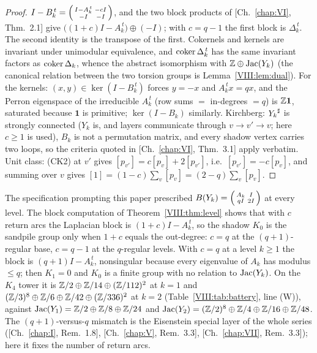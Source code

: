 \begin{proof}
$I-B_k^{\,t}=\begin{psmallmatrix}I-A_k^{\,t}&-cI\\-I&-I\end{psmallmatrix}$, and the two
block products of [Ch.~\ref{chap:VI}, Thm.~2.1] give $\bigl((1+c)I-A_k^{\,t}\bigr)\oplus(-I)$; with
$c=q-1$ the first block is $\Delta_k^{\,t}$. The second identity is the transpose of
the first. Cokernels and kernels are invariant under unimodular equivalence, and
$\operatorname{coker}\Delta_k^{\,t}$ has the same invariant factors as $\operatorname{coker}\Delta_k$, whence the
abstract isomorphism with $\mathbb{Z}\oplus\operatorname{Jac}(Y_k)$ (the canonical relation between the two
torsion groups is Lemma~\ref{VIII:lem:dual}). For the kernels: $(x,y)\in\ker(I-B_k^{\,t})$
forces $y=-x$ and $A_k^{\,t}x=qx$, and the Perron eigenspace of the irreducible
$A_k^{\,t}$ (row sums $=$ in-degrees $=q$) is $\mathbb{Z}\mathbf1$, saturated because $\mathbf1$
is primitive; $\ker(I-B_k)$ similarly. Kirchberg: ${Y_k}^{\sharp}$ is strongly connected
($Y_k$ is, and layers communicate through $v\to v'\to v$; here $c\ge1$ is used), $B_k$
is not a permutation matrix, and every shadow vertex carries two loops, so the criteria
quoted in [Ch.~\ref{chap:VI}, Thm.~3.1] apply verbatim. Unit class: (CK2) at $v'$ gives
$[p_{v'}]=c[p_v]+2[p_{v'}]$, i.e.\ $[p_{v'}]=-c[p_v]$, and summing over $v$ gives
$[1]=(1-c)\sum_v[p_v]=(2-q)\sum_v[p_v]$.
\end{proof}

\begin{remark}\label{VIII:rem:cq}
The specification prompting this paper prescribed $B(Y_k)=\begin{psmallmatrix}A_k&I\\
qI&2I\end{psmallmatrix}$ at every level. The block computation of
Theorem~\ref{VIII:thm:level} shows that with $c$ return arcs the Laplacian block is
$(1+c)I-A_k^{\,t}$, so the shadow $K_0$ is the sandpile group only when $1+c$ equals the
out-degree: $c=q$ at the $(q{+}1)$-regular base, $c=q-1$ at the $q$-regular levels.
With $c=q$ at a level $k\ge1$ the block is $(q{+}1)I-A_k^{\,t}$, nonsingular because
every eigenvalue of $A_k$ has modulus $\le q$; then $K_1=0$ and $K_0$ is a finite group
with no relation to $\operatorname{Jac}(Y_k)$. On the $K_4$ tower it is $\mathbb{Z}/2\oplus\mathbb{Z}/14\oplus(\mathbb{Z}/112)^2$
at $k=1$ and $(\mathbb{Z}/3)^8\oplus\mathbb{Z}/6\oplus\mathbb{Z}/42\oplus(\mathbb{Z}/336)^2$ at $k=2$
(Table~\ref{VIII:tab:battery}, line (W)), against $\operatorname{Jac}(Y_1)=\mathbb{Z}/2\oplus\mathbb{Z}/8\oplus\mathbb{Z}/24$ and
$\operatorname{Jac}(Y_2)=(\mathbb{Z}/2)^8\oplus\mathbb{Z}/4\oplus\mathbb{Z}/16\oplus\mathbb{Z}/48$. The $(q{+}1)$-versus-$q$ mismatch
is the Eisenstein special layer of the whole series ([Ch.~\ref{chap:I}, Rem.~1.8], [Ch.~\ref{chap:V}, Rem.~3.3],
[Ch.~\ref{chap:VII}, Rem.~3.3]); here it fixes the number of return arcs.
\end{remark}

